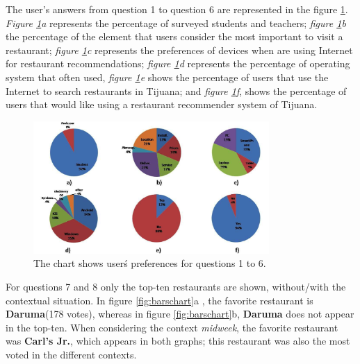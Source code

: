 The user's answers from question 1 to question 6 are represented in
the figure \ref{fig:cakeschart}. \textit{Figure \ref{fig:cakeschart}a}
represents the percentage of surveyed students and teachers;
\textit{figure \ref{fig:cakeschart}b}  the percentage of the element
that users consider the most important to visit a restaurant;
\textit{figure \ref{fig:cakeschart}c} represents the preferences of
devices when are using Internet for restaurant recommendations;
\textit{figure \ref{fig:cakeschart}d} represents the percentage of
operating system that often used, \textit{figure
\ref{fig:cakeschart}e} shows the percentage of users that use the
Internet to search restaurants in Tijuana; and \textit{figure
\ref{fig:cakeschart}f}, shows the percentage of users that would like
using a restaurant recommender system of Tijuana.
\begin{figure}
\captionsetup{justification=centering,margin=2cm,font=footnotesize}
\centering
\setlength\fboxsep{0pt}
\includegraphics[width=0.8\textwidth]{img/cakes.png}
\caption{The chart shows user\'s preferences for questions 1 to 6.}
\label{fig:cakeschart}     
\end{figure}
For questions 7 and 8 only the top-ten restaurants are shown,
without/with the contextual situation. In figure \ref{fig:barschart}a ,
the favorite restaurant is \textbf{Daruma}(178 votes),  whereas in
figure \ref{fig:barschart}b, \textbf{Daruma} does not appear in the
top-ten. When considering the context \textit{midweek}, the favorite
restaurant was \textbf{Carl's Jr.}, which appears in both graphs; this
restaurant was also the most voted in the different contexts.
